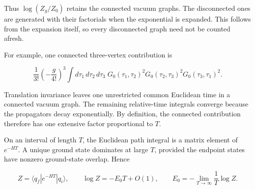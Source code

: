 Thus $\log(Z_g/Z_0)$ retains the connected vacuum graphs. The disconnected
ones are generated with their factorials when the exponential is expanded.
This follows from the expansion itself, so every disconnected graph need not
be counted afresh.

For example, one connected three-vertex contribution is

\begin{equation}
 \frac{1}{3!}\left(-\frac{g}{4!}\right)^3
 \int d\tau_1\,d\tau_2\,d\tau_3\;
 G_0(\tau_1,\tau_2)^2G_0(\tau_2,\tau_3)^2
 G_0(\tau_3,\tau_1)^2.
 \label{eq:253a-three-vertex-connected}
\end{equation}

Translation invariance leaves one unrestricted common Euclidean time in a
connected vacuum graph. The remaining relative-time integrals converge
because the propagators decay exponentially. By definition, the connected
contribution therefore has one extensive factor proportional to $T$.

On an interval of length $T$, the Euclidean path integral is a matrix element
of $e^{-HT}$. A unique ground state dominates at large $T$, provided the
endpoint states have nonzero ground-state overlap. Hence

\begin{equation}
 Z=\langle q_f|e^{-HT}|q_i\rangle,
 \qquad
 \log Z=-E_0T+O(1),
 \qquad
 E_0=-\lim_{T\to\infty}\frac{1}{T}\log Z.
 \label{eq:253a-vacuum-energy}
\end{equation}

